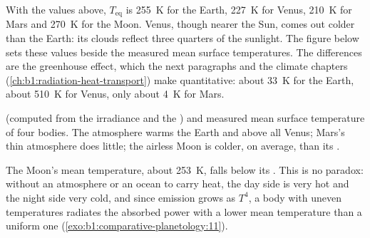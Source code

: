 With the values above, $T_\mathrm{eq}$ is \qty{255}{K} for the Earth,
\qty{227}{K} for Venus, \qty{210}{K} for Mars and \qty{270}{K} for the Moon.
Venus, though nearer the Sun, comes out colder than the Earth: its clouds
reflect three quarters of the sunlight. The figure below sets these values
beside the measured mean surface temperatures. The differences are the
greenhouse effect, which the next paragraphs and the climate chapters
(\cref{ch:b1:radiation-heat-transport}) make quantitative: about \qty{33}{K}
for the Earth, about \qty{510}{K} for Venus, only about \qty{4}{K} for Mars.

\begin{omfigure}

{\small {} (computed from the irradiance and the ) and measured mean surface temperature of four bodies. The
atmosphere warms the Earth and above all Venus; Mars's thin atmosphere does
little; the airless Moon is colder, on average, than its .}
\end{omfigure}

The Moon's mean temperature, about \qty{253}{K}, falls below its
. This is no paradox: without an atmosphere or an
ocean to carry heat, the day side is very hot and the night side very cold,
and since emission grows as $T^4$, a body with uneven temperatures
radiates the absorbed power with a lower mean temperature than a uniform
one (\cref{exo:b1:comparative-planetology:11}).

